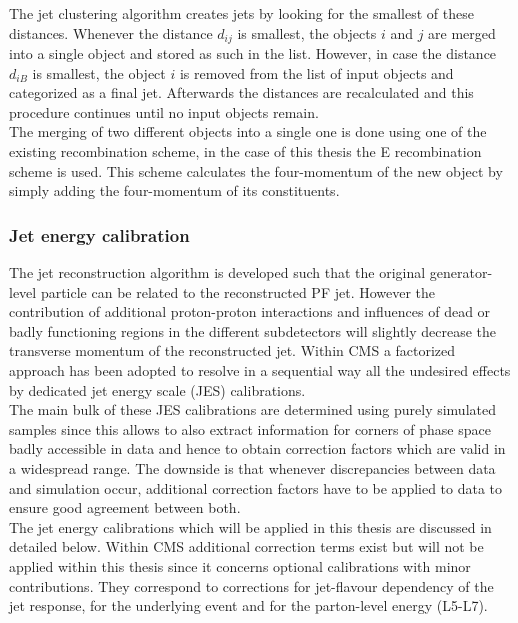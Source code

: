 The jet clustering algorithm creates jets by looking for the smallest of these distances. Whenever the distance $d_{ij}$ is smallest, the objects $i$ and $j$ are merged into a single object and stored as such in the list. However, in case the distance $d_{iB}$ is smallest, the object $i$ is removed from the list of input objects and categorized as a final jet. Afterwards the distances are recalculated and this procedure continues until no input objects remain.
\\
The merging of two different objects into a single one is done using one of the existing recombination scheme, in the case of this thesis the E recombination scheme is used. This scheme calculates the four-momentum of the new object by simply adding the four-momentum of its constituents. %

\subsubsection*{Jet energy calibration}

The jet reconstruction algorithm is developed such that the original generator-level particle can be related to the reconstructed PF jet. However the contribution of additional proton-proton interactions and influences of dead or badly functioning regions in the different subdetectors will slightly decrease the transverse momentum of the reconstructed jet.
Within CMS a factorized approach has been adopted to resolve in a sequential way all the undesired effects by dedicated jet energy scale (JES) calibrations.
\\
The main bulk of these JES calibrations are determined using purely simulated samples since this allows to also extract information for corners of phase space badly accessible in data and hence to obtain correction factors which are valid in a widespread range. The downside is that whenever discrepancies between data and simulation occur, additional correction factors have to be applied to data to ensure good agreement between both.
\\
The jet energy calibrations which will be applied in this thesis are discussed in detailed below. 
Within CMS additional correction terms exist but will not be applied within this thesis since it concerns optional calibrations with minor contributions. They correspond to corrections for jet-flavour dependency of the jet response, for the underlying event and for the parton-level energy (L5-L7).

